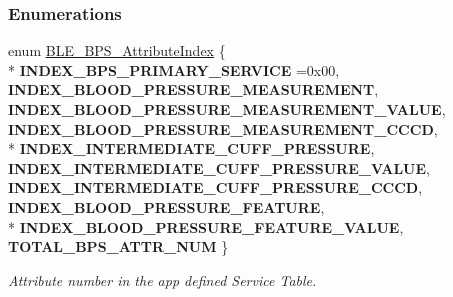 \subsubsection*{Enumerations}
\begin{DoxyCompactItemize}
\item 
enum \hyperlink{group___b_l_e___b_p_s_gaa06f231057fdb6110bac1000b0388d68}{B\+L\+E\+\_\+\+B\+P\+S\+\_\+\+Attribute\+Index} \{ \\*
{\bfseries I\+N\+D\+E\+X\+\_\+\+B\+P\+S\+\_\+\+P\+R\+I\+M\+A\+R\+Y\+\_\+\+S\+E\+R\+V\+I\+CE} =0x00, 
{\bfseries I\+N\+D\+E\+X\+\_\+\+B\+L\+O\+O\+D\+\_\+\+P\+R\+E\+S\+S\+U\+R\+E\+\_\+\+M\+E\+A\+S\+U\+R\+E\+M\+E\+NT}, 
{\bfseries I\+N\+D\+E\+X\+\_\+\+B\+L\+O\+O\+D\+\_\+\+P\+R\+E\+S\+S\+U\+R\+E\+\_\+\+M\+E\+A\+S\+U\+R\+E\+M\+E\+N\+T\+\_\+\+V\+A\+L\+UE}, 
{\bfseries I\+N\+D\+E\+X\+\_\+\+B\+L\+O\+O\+D\+\_\+\+P\+R\+E\+S\+S\+U\+R\+E\+\_\+\+M\+E\+A\+S\+U\+R\+E\+M\+E\+N\+T\+\_\+\+C\+C\+CD}, 
\\*
{\bfseries I\+N\+D\+E\+X\+\_\+\+I\+N\+T\+E\+R\+M\+E\+D\+I\+A\+T\+E\+\_\+\+C\+U\+F\+F\+\_\+\+P\+R\+E\+S\+S\+U\+RE}, 
{\bfseries I\+N\+D\+E\+X\+\_\+\+I\+N\+T\+E\+R\+M\+E\+D\+I\+A\+T\+E\+\_\+\+C\+U\+F\+F\+\_\+\+P\+R\+E\+S\+S\+U\+R\+E\+\_\+\+V\+A\+L\+UE}, 
{\bfseries I\+N\+D\+E\+X\+\_\+\+I\+N\+T\+E\+R\+M\+E\+D\+I\+A\+T\+E\+\_\+\+C\+U\+F\+F\+\_\+\+P\+R\+E\+S\+S\+U\+R\+E\+\_\+\+C\+C\+CD}, 
{\bfseries I\+N\+D\+E\+X\+\_\+\+B\+L\+O\+O\+D\+\_\+\+P\+R\+E\+S\+S\+U\+R\+E\+\_\+\+F\+E\+A\+T\+U\+RE}, 
\\*
{\bfseries I\+N\+D\+E\+X\+\_\+\+B\+L\+O\+O\+D\+\_\+\+P\+R\+E\+S\+S\+U\+R\+E\+\_\+\+F\+E\+A\+T\+U\+R\+E\+\_\+\+V\+A\+L\+UE}, 
{\bfseries T\+O\+T\+A\+L\+\_\+\+B\+P\+S\+\_\+\+A\+T\+T\+R\+\_\+\+N\+UM}
 \}\hypertarget{group___b_l_e___b_p_s_gaa06f231057fdb6110bac1000b0388d68}{}\label{group___b_l_e___b_p_s_gaa06f231057fdb6110bac1000b0388d68}
\begin{DoxyCompactList}\small\item\em Attribute number in the app defined Service Table. \end{DoxyCompactList}
\end{DoxyCompactItemize}
